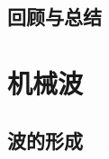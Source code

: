 \documentclass[color=purple,openany]{textbook-cn}
\begin{document}
\begin{Case}
\item \lipsum[1][3]
\item \lipsum[1][3]
\item \lipsum[1][3]
\item \lipsum[1][3]
\end{Case}

\begin{Link}
\zhlipsum[1]
\end{Link}

\section{回顾与总结}

\begin{Point}
\lipsum[2]
\end{Point}

\begin{Case*}
\item \lipsum[1][3]
\item \lipsum[1][3]
\item \lipsum[1][3]
\item \lipsum[1][3]
\end{Case*}

\begin{Link}
\zhlipsum[1]
\end{Link}





\chaptersaying{\lipsum[1][9]}
\chapter{机械波}


\begin{Block}[章节引入]
\lipsum[1-3]
\end{Block}

\section{波的形成}
\begin{Point}
\lipsum[2]
\end{Point}

\begin{Case}
\item \lipsum[1][3]
\item \lipsum[1][3]
\item \lipsum[1][3]
\item \lipsum[1][3]
\end{Case}
\end{document}
